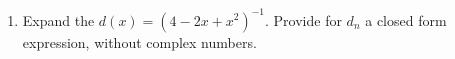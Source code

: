 \begin{enumerate}
\begin{comment}
{\em Now that I am done grading, two comments:}\\
1.  Note the ``annihilation'' or selection action of the operator
$[z^n]$.  It is often useful in simplifying complex expressions, as it
removes one summation level, by selecting a single term out of the summed
over sequence.\\
2.  A note of different kind; a couple of students did more or less what I
write above, but for the binomial expansion used the dummy index $n$ (in
lieu of my $j$), not
noticing that it is already in use, in the extraction operator.
This produced a meaningless mess.  Dummy indices must be ``fresh,'' and
newly-minted. 
\end{comment}
\item
Expand the \ogf $d(x) = (4-2x+x^2)^{-1}$.  Provide for $d_n$ a closed form
expression, without complex numbers.
\begin{comment}
Complex numbers enter the calculation here since the given quadratic does
not have real roots; instead, they are $1\pm i\sqrt3$.  We find
\begin{align*}
d_n &= [x^n]\,\frac1{4-2x+x^2} = [x^n]\frac1{(1-i\sqrt{3} -x)(1+i\sqrt{3}
-x)} =[x^n] \frac i{2\sqrt3}\lp \frac1{1+i\sqrt{3} -x} -\frac1{1-i\sqrt{3}
-x}\rp,
\end{align*}
following a \pfd.  This can be further developed,
\begin{align*}
d_n &= \frac i{2\sqrt3} [x^n] \lp
\frac1{1+i\sqrt3} \frac1{1 -\frac x{1+i\sqrt{3}}}
- \frac1{1-i\sqrt3} \frac1{1 -\frac x{1-i\sqrt{3}}} \rp\\
 &= \frac i{2\sqrt3} \lp
\frac1{1+i\sqrt3} \lp\frac1{1+i\sqrt3} \rp^n
-\frac1{1-i\sqrt3} \lp\frac1{1-i\sqrt3} \rp^n \rp.
\end{align*}
While this involves complex numbers, they are complex conjugates, and the
result of the subtraction is real. The expression can be somewhat
simplified; however, you were asked for an
explicitly real expression, not just real-valued, so we need to continue
beyond a simplification.\\
Since $(1-i\sqrt3) (1+i\sqrt3)=4$, we can write 
$\DS\frac1{1-i\sqrt3} = \frac14\,(1+i\sqrt3)$, and
\[
d_n = \frac i{2\sqrt3}\frac1{4^{n+1}}\lp (1-i\sqrt3)^{n+1}-
(1+i\sqrt3)^{n+1}\rp.
\]
We continue with the polar representation of the complex numbers:
$u+iv=r\,\exp\lp i\tan^{-1} (v/u)\rp$, where $r$ is the absolute value of
the number, $\sqrt{u^2+v^2}$, which is 2 for the numbers we have, and the
tangent of the angle, $\theta$ in the diagram is $\sqrt3$, hence
$\theta=\pi/3$.


\end{comment}
\end{enumerate}
